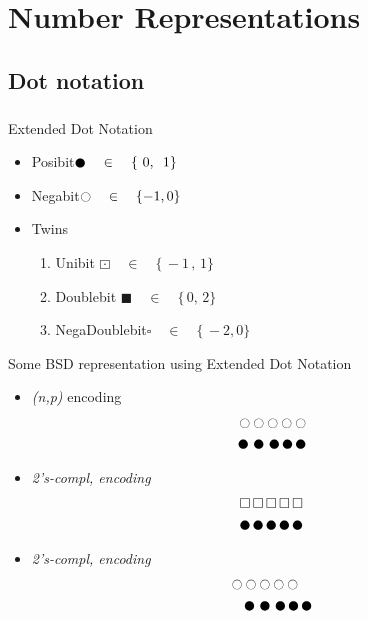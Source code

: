 \chapter{Number Representations}

\section{Dot notation}
\paragraph{} 
Extended Dot Notation
\begin{itemize}
	\item Posibit\quad  \(\newmoon\quad\in\quad \{\,\,0,\,\,\,1\}\) 
	\item Negabit\quad	\(\ocircle\quad\in\quad \{-1,0\}\)
	\item Twins
	\begin{enumerate}
		\item Unibit \quad \(\boxdot \quad\in\quad\{\,-1\,,\,1\}\)
		\item Doublebit \quad \(\blacksquare \quad\in\quad\{\,0,\,2\}\)
			\item NegaDoublebit\quad\(\square\quad \in\quad\{\,-2,0\}\)  
	\end{enumerate}

\end{itemize}

Some BSD representation using Extended Dot Notation
\begin{itemize}
	\item \textit{(n,p)} encoding \begin{align*}
		\ocircle\ocircle\ocircle\ocircle\ocircle\\
		\newmoon\,\,\newmoon\,\,\newmoon\,\newmoon\,\newmoon
	\end{align*}
	\item \textit{2's-compl, encoding}
	\begin{align*}
		\square\,\square\,\square\,\square\,\square\\
		\newmoon\,\newmoon\,\newmoon\,\newmoon\,\newmoon
	\end{align*}
	\item  \textit{2's-compl, encoding}
	\begin{align*}
		\ocircle\ocircle\ocircle\ocircle\ocircle\quad\\
		\newmoon\,\,\newmoon\,\,\newmoon\,\newmoon\,\newmoon
	\end{align*}
\end{itemize}
